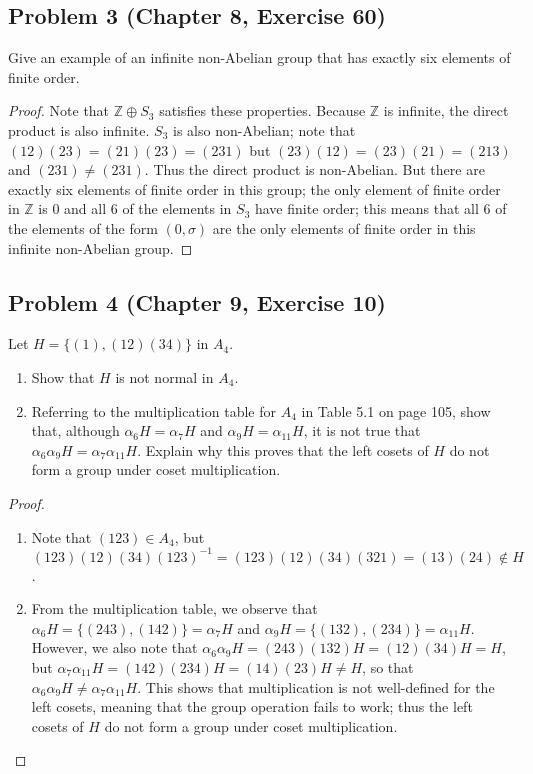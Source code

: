 \documentclass{article}
\begin{document}
\subsection*{Problem 3 (Chapter 8, Exercise 60)}
Give an example of an infinite non-Abelian group that has exactly six elements of finite order.
\begin{proof}
Note that $\mathbb{Z} \oplus S_3$ satisfies these properties. Because $\mathbb{Z}$ is infinite, the direct product is also infinite. $S_3$ is also non-Abelian; note that $(12)(23) = (21)(23) = (231)$ but $(23)(12) = (23)(21) = (213)$ and $(231) \neq (231)$. Thus the direct product is non-Abelian. But there are exactly six elements of finite order in this group; the only element of finite order in $\mathbb{Z}$ is 0 and all 6 of the elements in $S_3$ have finite order; this means that all 6 of the elements of the form $(0, \sigma)$ are the only elements of finite order in this infinite non-Abelian group. 
\end{proof}

\subsection*{Problem 4 (Chapter 9, Exercise 10)}
Let $H = \{ (1), (12)(34)\}$ in $A_4$.
\begin{enumerate}[label=\alph*.]
    \item Show that $H$ is not normal in $A_4$.
    \item Referring to the multiplication table for $A_4$ in Table 5.1 on page 105, show that, although $\alpha_6H = \alpha_7H$ and $\alpha_9H = \alpha_{11}H$, it is not true that $\alpha_6\alpha_9H = \alpha_7\alpha_{11}H$. Explain why this proves that the left cosets of $H$ do not form a group under coset multiplication.
\end{enumerate}
\begin{proof} 
\qquad
\begin{enumerate}[label=\alph*.]
    \item Note that $(123) \in A_4$, but $(123)(12)(34)(123)^{-1} = (123)(12)(34)(321) = (13)(24) \notin H$.
    \item From the multiplication table, we observe that $\alpha_6H = \{(243), (142)\} = \alpha_7H$ and $\alpha_9H = \{(132), (234)\} = \alpha_{11}H$. However, we also note that $\alpha_6\alpha_9H = (243)(132)H = (12)(34)H = H$, but $\alpha_7\alpha_{11}H = (142)(234)H = (14)(23)H \neq H$, so that $\alpha_6\alpha_9H \neq \alpha_7\alpha_{11}H$. This shows that multiplication is not well-defined for the left cosets, meaning that the group operation fails to work; thus the left cosets of $H$ do not form a group under coset multiplication. 
\end{enumerate}
\end{proof}
\end{document}
